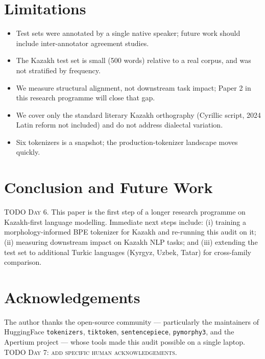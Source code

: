 \documentclass{article}
\begin{document}
\section{Limitations}
\label{sec:limitations}

\begin{itemize}
  \item Test sets were annotated by a single native speaker; future work should
        include inter-annotator agreement studies.
  \item The Kazakh test set is small (500 words) relative to a real corpus,
        and was not stratified by frequency.
  \item We measure structural alignment, not downstream task impact;
        Paper 2 in this research programme will close that gap.
  \item We cover only the standard literary Kazakh orthography (Cyrillic script,
        2024 Latin reform not included) and do not address dialectal variation.
  \item Six tokenizers is a snapshot; the production-tokenizer landscape moves quickly.
\end{itemize}

\section{Conclusion and Future Work}
\label{sec:conclusion}

\textsc{TODO Day 6.}
This paper is the first step of a longer research programme on
Kazakh-first language modelling. Immediate next steps include:
(i) training a morphology-informed BPE tokenizer for Kazakh and re-running
this audit on it; (ii) measuring downstream impact on Kazakh NLP tasks; and
(iii) extending the test set to additional Turkic languages
(Kyrgyz, Uzbek, Tatar) for cross-family comparison.

\section*{Acknowledgements}
The author thanks the open-source community --- particularly the maintainers of
HuggingFace \texttt{tokenizers}, \texttt{tiktoken}, \texttt{sentencepiece},
\texttt{pymorphy3}, and the Apertium project --- whose tools made this audit
possible on a single laptop. \textsc{TODO Day 7: add specific human acknowledgements.}



\end{document}
